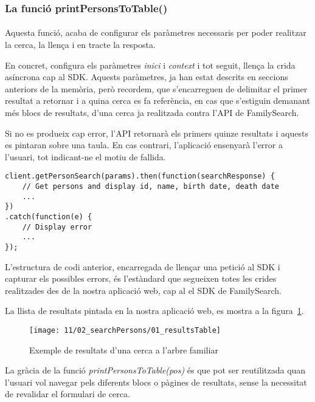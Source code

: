 \subsubsection{La funció printPersonsToTable()}

\paragraph{}
Aquesta funció, acaba de configurar els paràmetres necessaris per poder realitzar la cerca, la llença i en tracte la resposta.

En concret, configura els paràmetres \emph{inici} i \emph{context} i tot seguit, llença la crida asíncrona cap al SDK. Aquests paràmetres, ja han estat descrits en seccions anteriors de la memòria, però recordem, que s'encarreguen de delimitar el primer resultat a retornar i a quina cerca es fa referència, en cas que s'estiguin demanant més blocs de resultats, d'una cerca ja realitzada contra l'API de FamilySearch.

Si no es produeix cap error, l'API retornarà els primers quinze resultats i aquests es pintaran sobre una taula. En cas contrari, l'aplicació ensenyarà l'error a l'usuari, tot indicant-ne el motiu de fallida.

\begin{lstlisting}[style=rawOwn,caption={Llençament de peticions contra el SDK i captura d'errors}]
client.getPersonSearch(params).then(function(searchResponse) {
    // Get persons and display id, name, birth date, death date
    ...
})
.catch(function(e) {
    // Display error
    ...
});
\end{lstlisting}

L'estructura de codi anterior, encarregada de llençar una petició al SDK i capturar els possibles errors, és l'estàndard que segueixen totes les crides realitzades des de la nostra aplicació web, cap al el SDK de FamilySearch.

La llista de resultats pintada en la nostra aplicació web, es mostra a la figura~\ref{fig:searchTableResults}.

\begin{figure}[h]
    \texttt{[image: 11/02\_searchPersons/01\_resultsTable]}
    \centering
    \caption{Exemple de resultats d'una cerca a l'arbre familiar}\label{fig:searchTableResults}
\end{figure}

La gràcia de la funció \emph{printPersonsToTable(pos)} és que pot ser reutilitzada quan l'usuari vol navegar pels diferents blocs o pàgines de resultats, sense la necessitat de revalidar el formulari de cerca.


